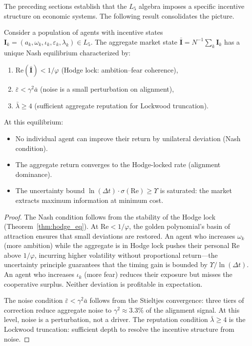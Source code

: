 The preceding sections establish that the $L_5$ algebra imposes a specific incentive structure on economic systems. The following result consolidates the picture.

\begin{theorem}\label{thm:nash}
Consider a population of agents with incentive states $\mathbf{I}_k = (a_k, \omega_k, \iota_k, \varepsilon_k, \lambda_k) \in L_5$. The aggregate market state $\bar{\mathbf{I}} = N^{-1}\sum_k \mathbf{I}_k$ has a unique Nash equilibrium characterized by:
\begin{enumerate}[noitemsep]
    \item $\mathrm{Re}(\bar{\mathbf{I}}) < 1/\varphi$ \quad (Hodge lock: ambition--fear coherence),
    \item $\bar{\varepsilon} < \gamma^2 \bar{a}$ \quad (noise is a small perturbation on alignment),
    \item $\bar{\lambda} \geq 4$ \quad (sufficient aggregate reputation for Lockwood truncation).
\end{enumerate}
At this equilibrium:
\begin{itemize}[noitemsep]
    \item No individual agent can improve their return by unilateral deviation (Nash condition).
    \item The aggregate return converges to the Hodge-locked rate (alignment dominance).
    \item The uncertainty bound $\ln(\Delta t) \cdot \sigma(\mathrm{Re}) \geq \Upsilon$ is saturated: the market extracts maximum information at minimum cost.
\end{itemize}
\end{theorem}

\begin{proof}
The Nash condition follows from the stability of the Hodge lock (Theorem~\ref{thm:hodge_eq}). At $\mathrm{Re} < 1/\varphi$, the golden polynomial's basin of attraction ensures that small deviations are restored. An agent who increases $\omega_k$ (more ambition) while the aggregate is in Hodge lock pushes their personal Re above $1/\varphi$, incurring higher volatility without proportional return---the uncertainty principle guarantees that the timing gain is bounded by $\Upsilon / \ln(\Delta t)$. An agent who increases $\iota_k$ (more fear) reduces their exposure but misses the cooperative surplus. Neither deviation is profitable in expectation.

The noise condition $\bar{\varepsilon} < \gamma^2 \bar{a}$ follows from the Stieltjes convergence: three tiers of correction reduce aggregate noise to $\gamma^2 \approx 3.3\%$ of the alignment signal. At this level, noise is a perturbation, not a driver. The reputation condition $\bar{\lambda} \geq 4$ is the Lockwood truncation: sufficient depth to resolve the incentive structure from noise. \qedhere
\end{proof}

